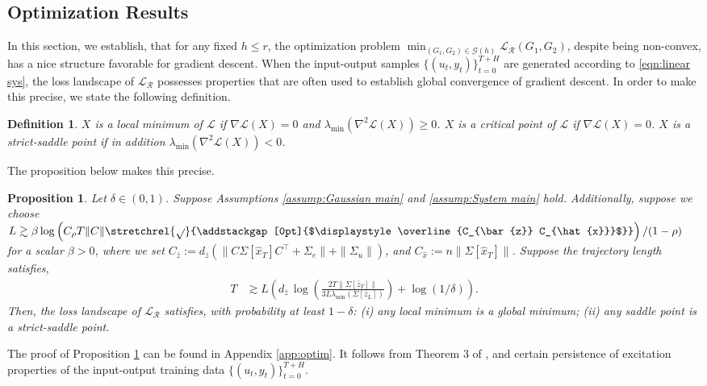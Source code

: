 \documentclass[11pt]{article}
\newtheorem{definition}{Definition}
\newtheorem{proposition}{Proposition}
\renewcommand{\cite}{\citep}
\newcommand{\ybar}{\bar{y}}
\newcommand{\zbar}{\bar{z}}
\newcommand{\xtil}{\hat{x}}
\newcommand{\norm}[1]{\|{#1} \|}
\newcommand{\normbig}[1]{\left\|{#1} \right\|}
\newcommand{\T}{\top}
\newcommand{\<}{\langle}
\renewcommand{\>}{\rangle}
\numberwithin{equation}{section}
\newcommand\mysqrt[2][0pt]{\stretchrel{\sqrt{}}{\addstackgap%
		[#1]{$\displaystyle\overline{#2}$}}}
\begin{document}
\subsection{Optimization Results}\label{subsec:optimization}

In this section, we establish, that for any fixed $h \le r$, the optimization problem $\min_{(G_1, G_2) \in \mathcal{G}(h)} \mathcal{L}_{\mathcal{R}}(G_1, G_2)$, despite being non-convex, has a nice structure favorable for gradient descent. 
When the input-output samples $\lbrace (u_t, y_t) \rbrace_{t =0}^{T+H}$ are generated according to \eqref{eqn:linear sys}, the loss landscape of $\mathcal{L}_{\mathcal{R}}$ possesses properties that are often used to establish global convergence of gradient descent. 
In order to make this precise, we state the following definition.
\begin{definition}
    $X$ is a \emph{local minimum} of $\mathcal{L}$ if $\nabla \mathcal{L}(X) = 0$ and $\lambda_{\min}(\nabla^2 \mathcal{L}(X)) \ge 0$.
    $X$ is a \emph{critical point} of $\mathcal{L}$ if $\nabla \mathcal{L}(X) = 0$. 
    $X$ is a \emph{strict-saddle} point if in addition $\lambda_{\min}(\nabla^2 \mathcal{L}(X))< 0$.
\end{definition}
The proposition below makes this precise.
\begin{proposition}\label{prop:landscape}
     Let $\delta \in (0,1)$. Suppose Assumptions  \ref{assump:Gaussian main} and \ref{assump:System main} hold. Additionally, suppose we choose $L \gtrsim \beta \log\left(C_\rho T \norm{C}\mysqrt{C_{\zbar} C_{\xtil}}\right)/(1-\rho)$ for a scalar $\beta >0$, where we set $C_{\zbar}:= d_{\zbar}(\norm{C\Sigma[\xtil_T]C^\T + \Sigma_e} + \norm{\Sigma_u}) $, and $C_{\xtil}:= n\norm{\Sigma[\xtil_T]} $. Suppose the trajectory length satisfies,
    \begin{align*}
        T & \gtrsim L \left(d_{\zbar} \,\log\left(\frac{2T\normbig{\Sigma[\zbar_T]}}{3L \lambda_{\min}\left(\Sigma[\zbar_L]\right)}\right)  + \log(1/\delta)\right).
    \end{align*} 
    Then, the loss landscape of $\mathcal{L}_\mathcal{R}$ satisfies, with probability at least $1-\delta$: (i) any local minimum is a global minimum; (ii) any saddle point is a strict-saddle point.
\end{proposition}

The proof of Proposition \ref{prop:landscape} can be found in Appendix \ref{app:optim}. It follows from Theorem 3 of \cite{zhu2020global}, and certain persistence of excitation properties of the input-output training data $\lbrace (u_t, y_t) \rbrace_{t =0}^{T+H}$. 
\end{document}
